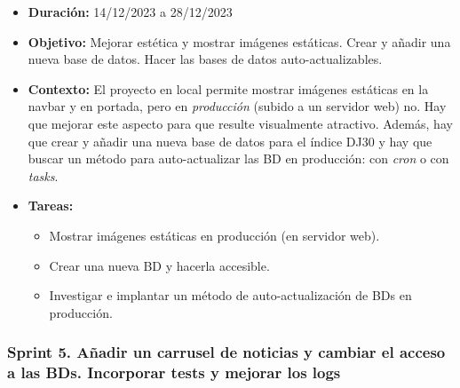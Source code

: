 \begin{itemize}
\item  
\textbf{Duración:} 14/12/2023 a 28/12/2023

\item
\textbf{Objetivo:} Mejorar estética y mostrar imágenes estáticas. Crear y añadir una nueva base de datos. Hacer las bases de datos auto-actualizables.

\item
\textbf{Contexto:} El proyecto en local permite mostrar imágenes estáticas en la navbar y en portada, pero en \emph{producción} (subido a un servidor web) no. Hay que mejorar este aspecto para que resulte visualmente atractivo. Además, hay que crear y añadir una nueva base de datos para el índice DJ30 y hay que buscar un método para auto-actualizar las BD en producción: con \emph{cron}\citep{wiki:cron} o con \emph{tasks}. 

\item
\textbf{Tareas:}
	\begin{itemize}
	\tightlist
	\item 
	Mostrar imágenes estáticas en producción (en servidor web).
	\item 	
	Crear una nueva BD y hacerla accesible. 
	\item 
	Investigar e implantar un método de auto-actualización de BDs en producción. 
  	\end{itemize}
\end{itemize}


\subsubsection{Sprint 5. Añadir un carrusel de noticias y cambiar el acceso a las BDs. Incorporar tests y mejorar los logs}


